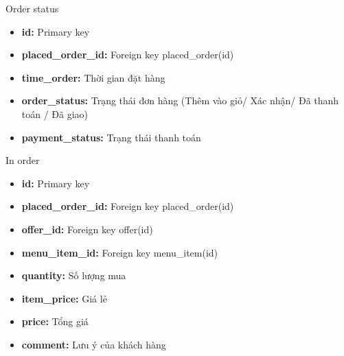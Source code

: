 \documentclass[aspectratio=43,xcolor=dvipsnames]{beamer}
\begin{document}
	\begin{frame}{Order status}
		\begin{itemize}
			\item \textbf{id:} Primary key
			\item \textbf{placed\_order\_id:} Foreign key placed\_order(id)
			\item \textbf{time\_order:} Thời gian đặt hàng
			\item \textbf{order\_status:} Trạng thái đơn hàng (Thêm vào giỏ/ Xác nhận/ Đã thanh toán / Đã giao)
			\item \textbf{payment\_status:} Trạng thái thanh toán
		\end{itemize}
	\end{frame}
	
	\begin{frame}{In order}
		\begin{itemize}
			\item \textbf{id:} Primary key
			\item \textbf{placed\_order\_id:} Foreign key placed\_order(id)
			\item \textbf{offer\_id:} Foreign key offer(id)
			\item \textbf{menu\_item\_id:} Foreign key menu\_item(id)
			\item \textbf{quantity:} Số lượng mua
			\item \textbf{item\_price:} Giá lẻ
			\item \textbf{price:} Tổng giá
			\item \textbf{comment:} Lưu ý của khách hàng
		\end{itemize}
	\end{frame}
	
\end{document}
